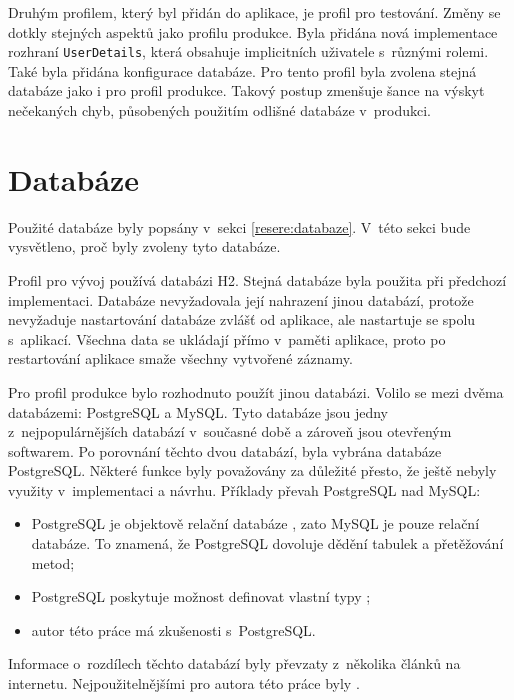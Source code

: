     Druhým profilem, který byl přidán do aplikace, je profil pro testování. Změny se dotkly stejných aspektů jako profilu produkce. Byla přidána nová implementace rozhraní \verb|UserDetails|, která obsahuje implicitních uživatele s~různými rolemi. Také byla přidána konfigurace databáze. Pro tento profil byla zvolena stejná databáze jako i pro profil produkce. Takový postup zmenšuje šance na výskyt nečekaných chyb, působených použitím odlišné databáze v~produkci.
    
\section{Databáze} \label{navrh:db}
    Použité databáze byly popsány v~sekci \ref{resere:databaze}. V~této sekci bude vysvětleno, proč byly zvoleny tyto databáze.
    
    Profil pro vývoj používá databázi H2. Stejná databáze byla použita při předchozí implementaci. Databáze nevyžadovala její nahrazení jinou databází, protože nevyžaduje nastartování databáze zvlášť od aplikace, ale nastartuje se spolu s~aplikací. Všechna data se ukládají přímo v~paměti aplikace, proto po restartování aplikace smaže všechny vytvořené záznamy.
    
    Pro profil produkce bylo rozhodnuto použít jinou databázi. Volilo se mezi dvěma databázemi: PostgreSQL a MySQL. Tyto databáze jsou jedny z~nejpopulárnějších databází v~současné době a zároveň jsou otevřeným softwarem. Po porovnání těchto dvou databází, byla vybrána databáze PostgreSQL. Některé funkce byly považovány za důležité přesto, že ještě nebyly využity v~implementaci a návrhu. Příklady převah PostgreSQL nad MySQL: 
    \begin{itemize}
            \setlength\itemsep{0.3em}
            \item PostgreSQL je objektově relační databáze \cite{postgres-about}, zato MySQL je pouze relační databáze\cite{mysql-wiki}. To znamená, že PostgreSQL dovoluje dědění tabulek a přetěžování metod;
            \item PostgreSQL poskytuje možnost definovat vlastní typy \cite{pstgres-create-type};
            \item autor této práce má zkušenosti s~PostgreSQL.
    \end{itemize}
    Informace o~rozdílech těchto databází byly převzaty z~několika článků na internetu. Nejpoužitelnějšími pro autora této práce byly \cite{mysql-postgres1, mysql-postgres2}.
    
